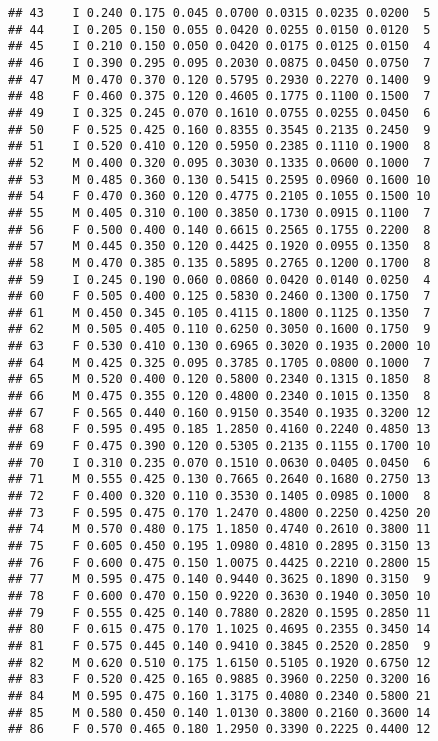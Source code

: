 \documentclass[
]{article}
\begin{document}
\begin{verbatim}
## 43    I 0.240 0.175 0.045 0.0700 0.0315 0.0235 0.0200  5
## 44    I 0.205 0.150 0.055 0.0420 0.0255 0.0150 0.0120  5
## 45    I 0.210 0.150 0.050 0.0420 0.0175 0.0125 0.0150  4
## 46    I 0.390 0.295 0.095 0.2030 0.0875 0.0450 0.0750  7
## 47    M 0.470 0.370 0.120 0.5795 0.2930 0.2270 0.1400  9
## 48    F 0.460 0.375 0.120 0.4605 0.1775 0.1100 0.1500  7
## 49    I 0.325 0.245 0.070 0.1610 0.0755 0.0255 0.0450  6
## 50    F 0.525 0.425 0.160 0.8355 0.3545 0.2135 0.2450  9
## 51    I 0.520 0.410 0.120 0.5950 0.2385 0.1110 0.1900  8
## 52    M 0.400 0.320 0.095 0.3030 0.1335 0.0600 0.1000  7
## 53    M 0.485 0.360 0.130 0.5415 0.2595 0.0960 0.1600 10
## 54    F 0.470 0.360 0.120 0.4775 0.2105 0.1055 0.1500 10
## 55    M 0.405 0.310 0.100 0.3850 0.1730 0.0915 0.1100  7
## 56    F 0.500 0.400 0.140 0.6615 0.2565 0.1755 0.2200  8
## 57    M 0.445 0.350 0.120 0.4425 0.1920 0.0955 0.1350  8
## 58    M 0.470 0.385 0.135 0.5895 0.2765 0.1200 0.1700  8
## 59    I 0.245 0.190 0.060 0.0860 0.0420 0.0140 0.0250  4
## 60    F 0.505 0.400 0.125 0.5830 0.2460 0.1300 0.1750  7
## 61    M 0.450 0.345 0.105 0.4115 0.1800 0.1125 0.1350  7
## 62    M 0.505 0.405 0.110 0.6250 0.3050 0.1600 0.1750  9
## 63    F 0.530 0.410 0.130 0.6965 0.3020 0.1935 0.2000 10
## 64    M 0.425 0.325 0.095 0.3785 0.1705 0.0800 0.1000  7
## 65    M 0.520 0.400 0.120 0.5800 0.2340 0.1315 0.1850  8
## 66    M 0.475 0.355 0.120 0.4800 0.2340 0.1015 0.1350  8
## 67    F 0.565 0.440 0.160 0.9150 0.3540 0.1935 0.3200 12
## 68    F 0.595 0.495 0.185 1.2850 0.4160 0.2240 0.4850 13
## 69    F 0.475 0.390 0.120 0.5305 0.2135 0.1155 0.1700 10
## 70    I 0.310 0.235 0.070 0.1510 0.0630 0.0405 0.0450  6
## 71    M 0.555 0.425 0.130 0.7665 0.2640 0.1680 0.2750 13
## 72    F 0.400 0.320 0.110 0.3530 0.1405 0.0985 0.1000  8
## 73    F 0.595 0.475 0.170 1.2470 0.4800 0.2250 0.4250 20
## 74    M 0.570 0.480 0.175 1.1850 0.4740 0.2610 0.3800 11
## 75    F 0.605 0.450 0.195 1.0980 0.4810 0.2895 0.3150 13
## 76    F 0.600 0.475 0.150 1.0075 0.4425 0.2210 0.2800 15
## 77    M 0.595 0.475 0.140 0.9440 0.3625 0.1890 0.3150  9
## 78    F 0.600 0.470 0.150 0.9220 0.3630 0.1940 0.3050 10
## 79    F 0.555 0.425 0.140 0.7880 0.2820 0.1595 0.2850 11
## 80    F 0.615 0.475 0.170 1.1025 0.4695 0.2355 0.3450 14
## 81    F 0.575 0.445 0.140 0.9410 0.3845 0.2520 0.2850  9
## 82    M 0.620 0.510 0.175 1.6150 0.5105 0.1920 0.6750 12
## 83    F 0.520 0.425 0.165 0.9885 0.3960 0.2250 0.3200 16
## 84    M 0.595 0.475 0.160 1.3175 0.4080 0.2340 0.5800 21
## 85    M 0.580 0.450 0.140 1.0130 0.3800 0.2160 0.3600 14
## 86    F 0.570 0.465 0.180 1.2950 0.3390 0.2225 0.4400 12

\end{verbatim}
\end{document}
